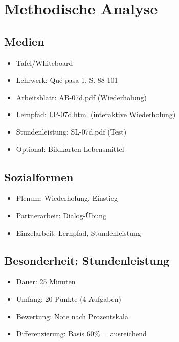 \documentclass[11pt,a4paper]{article}
\newcommand{\lehrwerk}{Qué pasa 1}
\newcommand{\lehrwerkseite}{S. 88-101}
\begin{document}
\section{Methodische Analyse}

\subsection{Medien}
\begin{itemize}
    \item Tafel/Whiteboard
    \item Lehrwerk: \lehrwerk, \lehrwerkseite
    \item Arbeitsblatt: AB-07d.pdf (Wiederholung)
    \item Lernpfad: LP-07d.html (interaktive Wiederholung)
    \item Stundenleistung: SL-07d.pdf (Test)
    \item Optional: Bildkarten Lebensmittel
\end{itemize}

\subsection{Sozialformen}
\begin{itemize}
    \item Plenum: Wiederholung, Einstieg
    \item Partnerarbeit: Dialog-Übung
    \item Einzelarbeit: Lernpfad, Stundenleistung
\end{itemize}

\subsection{Besonderheit: Stundenleistung}
\begin{itemize}
    \item Dauer: 25 Minuten
    \item Umfang: 20 Punkte (4 Aufgaben)
    \item Bewertung: Note nach Prozentskala
    \item Differenzierung: Basis 60\% = ausreichend
\end{itemize}

\end{document}
